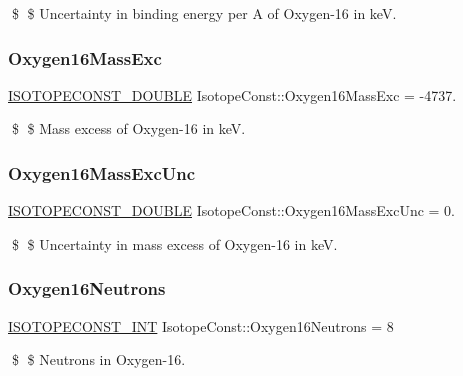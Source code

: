 \$ \$ Uncertainty in binding energy per A of Oxygen-\/16 in keV. \mbox{\label{group___isotope_const-_oxygen-_o16_ga664d6c91749de156750815d3178bc92c}} 
\subsubsection{\texorpdfstring{Oxygen16\+Mass\+Exc}{Oxygen16MassExc}}
{\footnotesize\ttfamily \mbox{\hyperlink{group___isotope_const-_macros_ga8f45a7272ce02c0b4c65c44636ed719a}{I\+S\+O\+T\+O\+P\+E\+C\+O\+N\+S\+T\+\_\+\+D\+O\+U\+B\+LE}} Isotope\+Const\+::\+Oxygen16\+Mass\+Exc = -\/4737.}

\$ \$ Mass excess of Oxygen-\/16 in keV. \mbox{\label{group___isotope_const-_oxygen-_o16_gac141038bedb6843a3555569fe45e0176}} 
\subsubsection{\texorpdfstring{Oxygen16\+Mass\+Exc\+Unc}{Oxygen16MassExcUnc}}
{\footnotesize\ttfamily \mbox{\hyperlink{group___isotope_const-_macros_ga8f45a7272ce02c0b4c65c44636ed719a}{I\+S\+O\+T\+O\+P\+E\+C\+O\+N\+S\+T\+\_\+\+D\+O\+U\+B\+LE}} Isotope\+Const\+::\+Oxygen16\+Mass\+Exc\+Unc = 0.}

\$ \$ Uncertainty in mass excess of Oxygen-\/16 in keV. \mbox{\label{group___isotope_const-_oxygen-_o16_ga020df83bfe6c89090b07053d32e80280}} 
\subsubsection{\texorpdfstring{Oxygen16\+Neutrons}{Oxygen16Neutrons}}
{\footnotesize\ttfamily \mbox{\hyperlink{group___isotope_const-_macros_ga5f18360b3e99483a35c32d789e62621c}{I\+S\+O\+T\+O\+P\+E\+C\+O\+N\+S\+T\+\_\+\+I\+NT}} Isotope\+Const\+::\+Oxygen16\+Neutrons = 8}

\$ \$ Neutrons in Oxygen-\/16. \mbox{\label{group___isotope_const-_oxygen-_o16_gac8417c6e18fefa2ab8d6e85e1a7f89ec}} 
